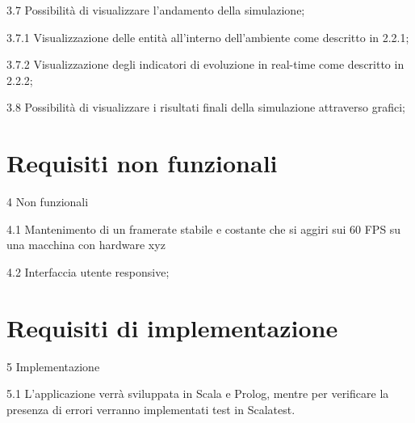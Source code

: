 \begin{myEnumerate}
\begin{myEnumerate}[label*=\arabic*.]
	\item[3.7] Possibilità di visualizzare l'andamento della simulazione;	
	\begin{myEnumerate}[label*=\arabic*.]
		\item[3.7.1] Visualizzazione delle entità all'interno dell'ambiente come descritto in 2.2.1;
		\item[3.7.2] Visualizzazione degli indicatori di evoluzione in real-time come descritto in 2.2.2;
	\end{myEnumerate}
	\item[3.8] Possibilità di visualizzare i risultati finali della simulazione attraverso grafici;
	\end{myEnumerate}
\end{myEnumerate}

\section{Requisiti non funzionali}

\begin{myEnumerate}[label*=\arabic*.]
	\item[4] Non funzionali
	\begin{myEnumerate}[label*=\arabic*.]
		\item[4.1] Mantenimento di un framerate stabile e costante che si aggiri sui 60 FPS su una macchina con hardware xyz
		\item[4.2] Interfaccia utente responsive;
	\end{myEnumerate}
\end{myEnumerate}


\section{Requisiti di implementazione}

\begin{myEnumerate}[label*=\arabic*.]
	\item[5] Implementazione
	\begin{myEnumerate}[label*=\arabic*.]
		\item[5.1] L'applicazione verrà sviluppata in Scala e Prolog, mentre per verificare la presenza di errori verranno implementati test in Scalatest.
	\end{myEnumerate}
\end{myEnumerate}